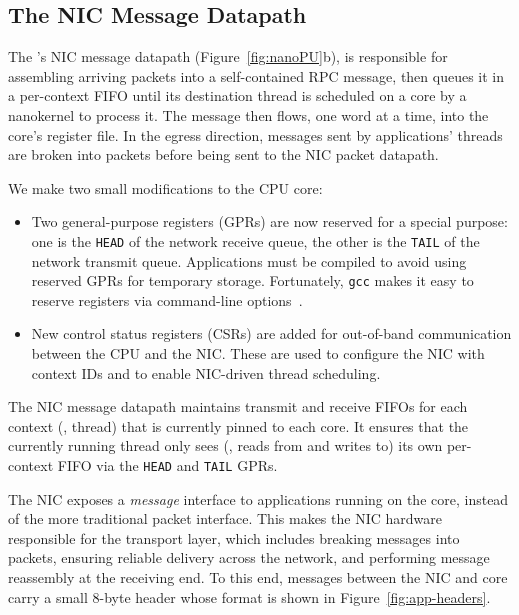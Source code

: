 \subsection{The NIC Message Datapath}
\label{ssec:niccore-interface}
The \name{}'s NIC message datapath (Figure~\ref{fig:nanoPU}b), is responsible for assembling arriving packets into a self-contained RPC message, then queues it in a per-context FIFO until its destination thread is scheduled on a core by a nanokernel to process it.
The message then flows, one word at a time, into the core's register file.
In the egress direction, messages sent by applications' threads are broken into packets before being sent to the NIC packet datapath.

We make two small modifications to the CPU core:
\begin{itemize}[topsep=0.4\baselineskip, leftmargin=20pt]
    \item Two general-purpose registers (GPRs) are now reserved for a special purpose: one is the \verb|HEAD| of the network receive queue, the other is the \verb|TAIL| of the network transmit queue.
    Applications must be compiled to avoid using reserved GPRs for temporary storage.
    Fortunately, \verb|gcc| makes it easy to reserve registers via command-line options~\cite{gcc-options}.
    \item New control status registers (CSRs) are added for out-of-band communication between the CPU and the NIC.
    These are used to configure the NIC with context IDs and to enable NIC-driven thread scheduling.
\end{itemize}

The NIC message datapath maintains transmit and receive FIFOs for each context (\ie, thread) that is currently pinned to each core.
It ensures that the currently running thread only sees (\ie, reads from and writes to) its own per-context FIFO via the \verb|HEAD| and \verb|TAIL| GPRs.

The NIC exposes a {\em message} interface to applications running on the core, instead of the more traditional packet interface.
This makes the \name{} NIC hardware responsible for the transport layer, which includes breaking messages into packets, ensuring reliable delivery across the network, and performing message reassembly at the receiving end.
To this end, messages between the NIC and core carry a small 8-byte header whose format is shown in Figure~\ref{fig:app-headers}.

\begin{figure}
  \centering
  \small
  \begin{minipage}[c]{0.9\linewidth}
  
  \end{minipage}
  \vspace{-10pt}
  \label{lst:asm}
\end{figure}

